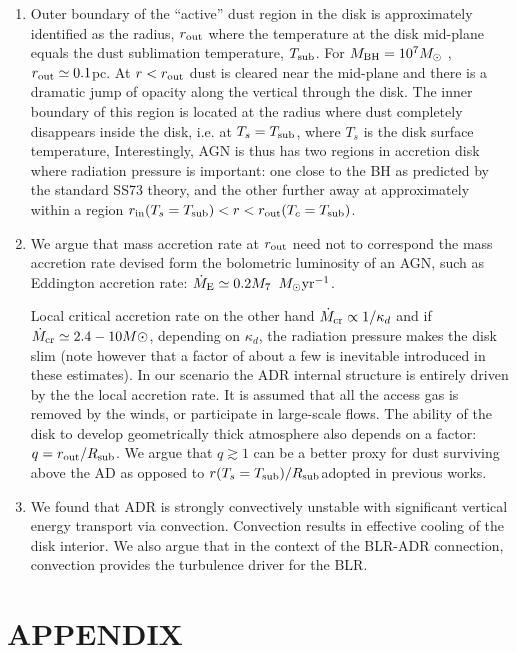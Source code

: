 \documentclass[12pt,english,preprint]{aastex}
\newcommand{\MsolYrM}{ \,M_{\odot}{\rm yr}^{-1} }
\begin{document}
\begin{enumerate}
\item Outer boundary of the ``active'' dust region in the disk is approximately
identified as the radius, $r_{{\rm out}}$ where the temperature at
the disk mid-plane equals the dust sublimation temperature, $T_{{\rm sub}}$.
For $M_{{\rm BH}}=10^{7}M_{\odot}$ , $r_{{\rm out}}\simeq0.1$pc.
At $r<r_{{\rm out}}$ dust is cleared near the mid-plane and there
is a dramatic jump of opacity along the vertical through the disk.
The inner boundary of this region is located at the radius where dust
completely disappears inside the disk, i.e. at $T_{s}=T_{{\rm sub}}$,
where $T_{s}$ is the disk surface temperature, Interestingly, AGN
is thus has two regions in accretion disk where radiation pressure
is important: one close to the BH as predicted by the standard SS73
theory, and the other further away at approximately within a region
$r_{{\rm in}}(T_{s}=T_{{\rm sub}})<r<r_{{\rm out}}(T_{c}=T_{{\rm sub}})$. 
\item We argue that mass accretion rate at $r_{{\rm out}}$ need not to
correspond the mass accretion rate devised form the bolometric luminosity
of an AGN, such as Eddington accretion rate: $\dot{M}_{{\rm E}}\simeq0.2 M_{7}$
$\MsolYrM$. 

Local critical accretion rate on the other hand $\dot{M}_{{\rm cr}}\propto1/\kappa_{d}$
and if $\dot{M}_{{\rm cr}}\simeq2.4-10M\odot$, depending on $\kappa_{d}$,
the radiation pressure makes the disk slim (note however that a factor
of about a few is inevitable introduced in these estimates). In our
scenario the ADR internal structure is entirely driven by the the
local accretion rate. It is assumed that all the access gas is removed
by the winds, or participate in large-scale flows. The ability of
the disk to develop geometrically thick atmosphere also depends on
a factor: $q=r_{{\rm out}}/R_{{\rm sub}}$. We argue that $q\gtrsim1$
can be a better proxy for dust surviving above the AD as opposed to
$r(T_{s}=T_{{\rm sub}})/R_{{\rm sub}}$adopted in previous works. 
\item We found that ADR is strongly convectively unstable with significant
vertical energy transport via convection. Convection results in effective
cooling of the disk interior. We also argue that in the context of
the BLR-ADR connection, convection provides the turbulence driver
for the BLR. 
\end{enumerate}

\section{APPENDIX}
\end{document}
